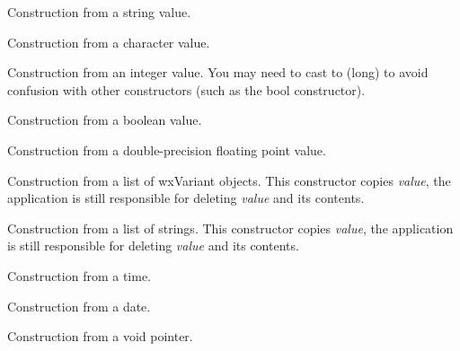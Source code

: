 

Construction from a string value.


Construction from a character value.


Construction from an integer value. You may need to cast to (long) to
avoid confusion with other constructors (such as the bool constructor).


Construction from a boolean value.


Construction from a double-precision floating point value.


Construction from a list of wxVariant objects. This constructor
copies {\it value}, the application is still responsible for
deleting {\it value} and its contents.


Construction from a list of strings. This constructor
copies {\it value}, the application is still responsible for
deleting {\it value} and its contents.



Construction from a time.


Construction from a date.


Construction from a void pointer.

